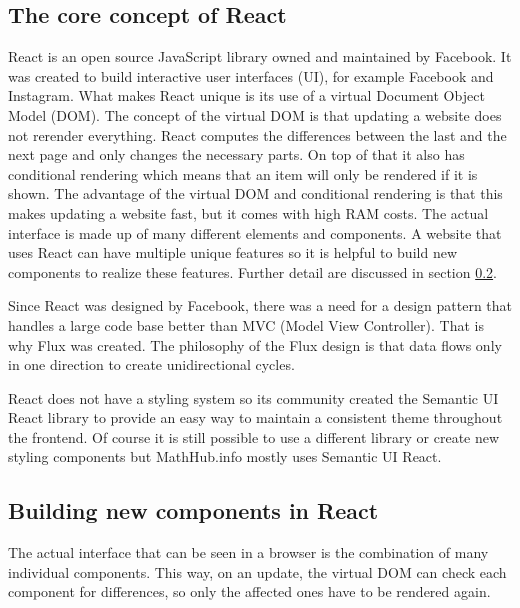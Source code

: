 \documentclass[11pt,a4paper]{article}
\begin{document}
\subsection{The core concept of React} \label{react}
React is an open source JavaScript library owned and maintained by Facebook.
It was created to build interactive user interfaces (UI), for example Facebook and Instagram.
What makes React unique is its use of a virtual Document Object Model (DOM).
The concept of the virtual DOM is that updating a website does not rerender everything.
React computes the differences between the last and the next page and only changes the necessary parts.
On top of that it also has conditional rendering which means that an item will only be rendered if it is shown.
The advantage of the virtual DOM and conditional rendering is that this makes updating a website fast, but it comes with high RAM costs.
The actual interface is made up of many different elements and components.
A website that uses React can have multiple unique features so it is helpful to build new components to realize these features.\cite{reactjs}
Further detail are discussed in section \ref{components}.

Since React was designed by Facebook, there was a need for a design pattern that handles a large code base better than MVC (Model View Controller).
That is why Flux was created.
The philosophy of the Flux design is that data flows only in one direction to create unidirectional cycles. \cite{flux}

React does not have a styling system so its community created the Semantic UI React library to provide an easy way to maintain a consistent theme throughout the frontend.
Of course it is still possible to use a different library or create new styling components but MathHub.info mostly uses Semantic UI React.

\subsection{Building new components in React} \label{components}
The actual interface that can be seen in a browser is the combination of many individual components.
This way, on an update, the virtual DOM can check each component for differences, so only the affected ones have to be rendered again.
\end{document}
